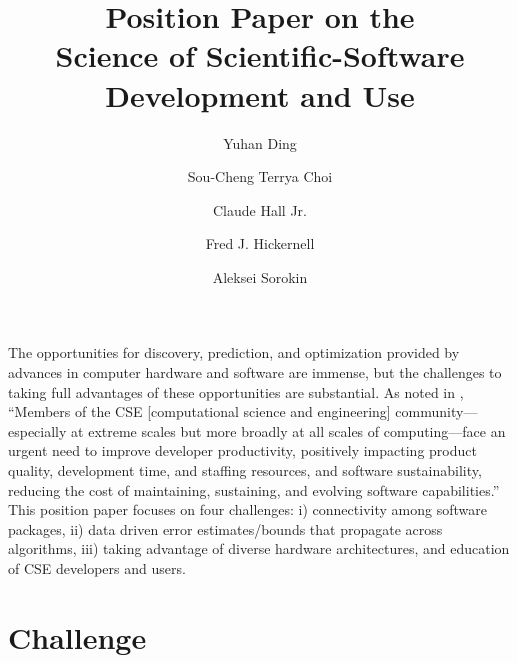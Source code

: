 \documentclass{amsart}
\begin{document}
\title{Position Paper on the \\ Science of Scientific-Software Development and Use}
\author{Yuhan Ding}
\address{Department of Applied Mathematics, RE 220, 10 W. 32nd St., Chicago, IL 60616}
\author{Sou-Cheng Terrya Choi}
\author{Claude Hall Jr.}
\author{Fred J. Hickernell}
\address{Department of Applied Mathematics, RE 220, 10 W. 32nd St., Chicago, IL 60616}
\author{Aleksei Sorokin}
\address{Department of Applied Mathematics, RE 220, 10 W. 32nd St., Chicago, IL 60616}

\maketitle

The opportunities for discovery, prediction, and optimization provided by advances in computer hardware and software are immense, but the challenges to taking full advantages of these opportunities are substantial.  As noted in \cite{ECP2020a}, ``Members of the CSE [computational science and engineering] community—especially at extreme scales but more broadly at all scales of computing—face an urgent need to improve developer productivity, positively impacting product quality, development time, and staffing resources, and software sustainability, reducing the cost of maintaining, sustaining, and evolving software capabilities.'' This position paper focuses on four challenges: i) connectivity among software packages, ii) data driven error estimates/bounds that propagate across algorithms, iii) taking advantage of diverse hardware architectures, and education of CSE developers and users.


\section{Challenge} %
\end{document}
